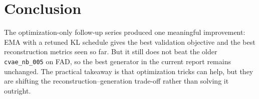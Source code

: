 \documentclass[10pt]{article}
\begin{document}
\section*{Conclusion}
The optimization-only follow-up series produced one meaningful improvement:
EMA with a retuned KL schedule gives the best validation objective and the best reconstruction metrics seen so far.
But it still does not beat the older \texttt{cvae\_nb\_005} on FAD, so the best generator in the current report remains unchanged.
The practical takeaway is that optimization tricks can help, but they are shifting the reconstruction--generation trade-off rather than solving it outright.
\end{document}
